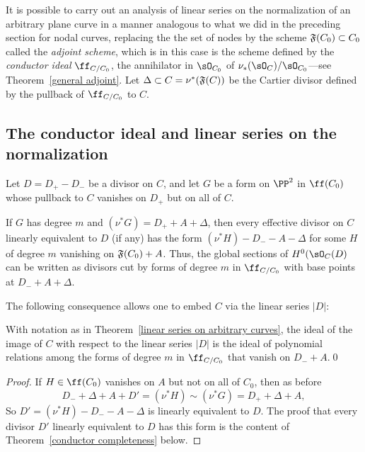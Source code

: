 It is possible to carry out an analysis of linear series on the normalization of an arbitrary plane curve in a manner  analogous to what we did in the preceding section for nodal curves, replacing the the set of nodes by the scheme $\adj(C_{0})\subset C_{0}$ called the \emph{adjoint scheme}, which is in this case is the scheme
defined by the \emph{conductor ideal} $\ff_{C/C_0}$, the annihilator in $\sO_{C_{0}}$ of $\nu_{*}(\sO_{C})/\sO_{C_{0}}$---see Theorem~\ref{general adjoint}. Let $\Delta\subset C = \nu^{*}(\adj(C))$ be the Cartier divisor
defined by the pullback of $\ff_{C/C_0}$ to $C$.

\subsection{The conductor ideal and linear series on the normalization}

\begin{theorem}\label{linear series on arbitrary curves}
Let $D = D_{+}-D_{-}$ be a divisor on $C$, and let $G$ be a form on $\PP^{2}$ in $\ff(C_{0})$ whose pullback to $C$
vanishes on $D_{+}$ but on all of $C$. 

If $G$ has degree $m$ and $(\nu^{*}G) = D_{+}+A+\Delta$, then every effective divisor on
$C$ linearly equivalent to $D$ (if any) has the form $(\nu^*H)-D_{-}-A-\Delta$ for some $H$ of degree $m$
 vanishing on $\adj(C_{0})+A$. Thus, the global sections of $H^{0}(\sO_{C}(D)$ can be written
as divisors cut by forms of degree $m$ in $\ff_{C/C_{0}}$ with base points at $D_{-}+A+\Delta$.
\end{theorem}

The following consequence allows one to embed $C$ via the linear series $|D|$:

\begin{corollary}
With notation as in Theorem~\ref{linear series on arbitrary curves}, the ideal of the image of
$C$ with respect to the linear series $|D|$ is the ideal of polynomial relations among the forms
of degree $m$ in $\ff_{C/C_{0}}$ that vanish on $D_{-}+A$.\qed
\end{corollary}

\begin{proof}
If $H\in \ff(C_{0})$ vanishes on $A$ but not on all of $C_{0}$, then as before
$$
 D_{-} +\Delta + A+ D' = (\nu^*H) \sim (\nu^*G) = D_{+} + \Delta + A,
$$
So $D' = (\nu^*{H})-D_{-}-A-\Delta$ is linearly equivalent to $D$. The proof that every
divisor $D'$ linearly equivalent to $D$ has this form is the content of
Theorem~\ref{conductor completeness} below.
\end{proof}


